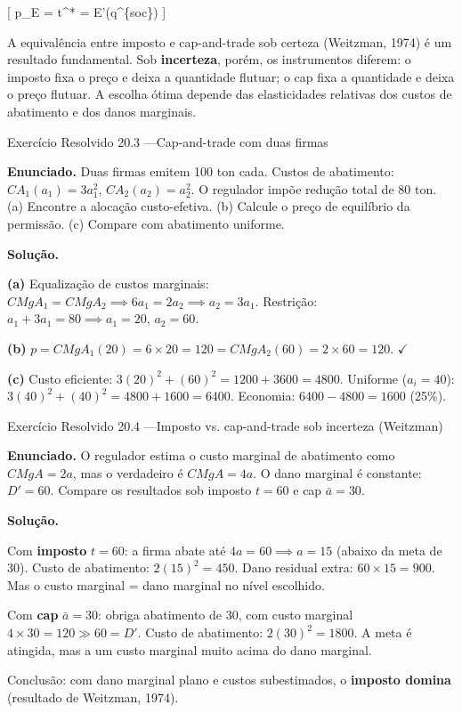 \documentclass[11pt,twoside,openright]{book}
\begin{document}
{[} p\_E = t\^{}* = E'(q\^{}\{soc\}) {]}

A equivalência entre imposto e cap-and-trade sob certeza (Weitzman,
1974) é um resultado fundamental. Sob \textbf{incerteza}, porém, os
instrumentos diferem: o imposto fixa o preço e deixa a quantidade
flutuar; o cap fixa a quantidade e deixa o preço flutuar. A escolha
ótima depende das elasticidades relativas dos custos de abatimento e dos
danos marginais.

\begin{exresolvidobox}{Exercício Resolvido 20.3 —Cap-and-trade com duas firmas}

\textbf{Enunciado.} Duas firmas emitem 100 ton cada. Custos de
abatimento: \(CA_1(a_1) = 3a_1^2\), \(CA_2(a_2) = a_2^2\). O regulador
impõe redução total de 80 ton. (a) Encontre a alocação custo-efetiva.
(b) Calcule o preço de equilíbrio da permissão. (c) Compare com
abatimento uniforme.

\textbf{Solução.}

\textbf{(a)} Equalização de custos marginais:
\(CMgA_1 = CMgA_2 \implies 6a_1 = 2a_2 \implies a_2 = 3a_1\). Restrição:
\(a_1 + 3a_1 = 80 \implies a_1 = 20\), \(a_2 = 60\).

\textbf{(b)}
\(p = CMgA_1(20) = 6 \times 20 = 120 = CMgA_2(60) = 2 \times 60 = 120\).
\(\checkmark\)

\textbf{(c)} Custo eficiente: \(3(20)^2 + (60)^2 = 1200 + 3600 = 4800\).
Uniforme (\(a_i = 40\)): \(3(40)^2 + (40)^2 = 4800 + 1600 = 6400\).
Economia: \(6400 - 4800 = 1600\) (25\%).

\end{exresolvidobox}

\begin{exresolvidobox}{Exercício Resolvido 20.4 —Imposto vs. cap-and-trade sob incerteza (Weitzman)}

\textbf{Enunciado.} O regulador estima o custo marginal de abatimento
como \(CMgA = 2a\), mas o verdadeiro é \(CMgA = 4a\). O dano marginal é
constante: \(D' = 60\). Compare os resultados sob imposto \(t = 60\) e
cap \(\bar{a} = 30\).

\textbf{Solução.}

Com \textbf{imposto} \(t = 60\): a firma abate até
\(4a = 60 \implies a = 15\) (abaixo da meta de 30). Custo de abatimento:
\(2(15)^2 = 450\). Dano residual extra: \(60 \times 15 = 900\). Mas o
custo marginal = dano marginal no nível escolhido.

Com \textbf{cap} \(\bar{a} = 30\): obriga abatimento de 30, com custo
marginal \(4 \times 30 = 120 \gg 60 = D'\). Custo de abatimento:
\(2(30)^2 = 1800\). A meta é atingida, mas a um custo marginal muito
acima do dano marginal.

Conclusão: com dano marginal plano e custos subestimados, o
\textbf{imposto domina} (resultado de Weitzman, 1974).

\end{exresolvidobox}
\end{document}
